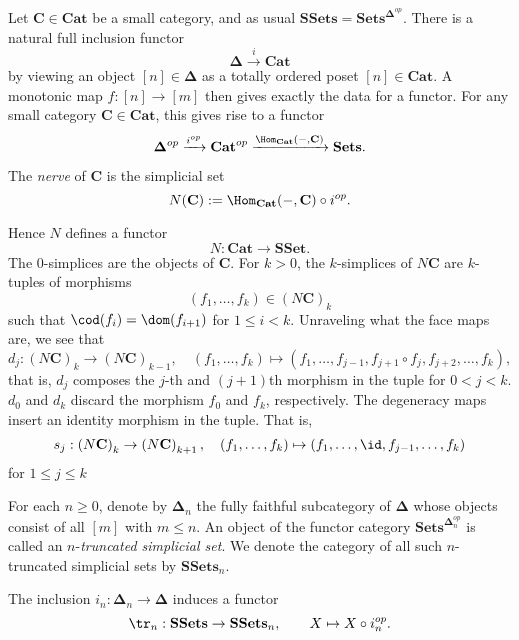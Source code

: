 %
%

Let $\mathbf{C} \in \mathbf{Cat}$ be a small category, and as usual $\mathbf{SSets} = \mathbf{Sets}^{\mathbf{\Delta}^{op}}$. There is a natural full inclusion functor
\[ \mathbf{\Delta} \xrightarrow{i} \mathbf{Cat} \]
by viewing an object $[n] \in \mathbf{\Delta}$ as a totally ordered poset $[n] \in \mathbf{Cat}$. A monotonic map $f : [n] \to [m]$ then gives exactly the data for a functor. For any small category $\mathbf{C} \in \mathbf{Cat}$, this gives rise to a functor
\[ \mathbf{\Delta}^{op} \xrightarrow{i^{op}} \mathbf{Cat}^{op} \xrightarrow{\Hom_{\mathbf{Cat}}\left(-, \mathbf{C}\right)} \mathbf{Sets}. \]
\begin{definition}
\label{def:nerve}
The \emph{nerve} of $\mathbf{C}$ is the simplicial set
\[ N(\mathbf{C}) := \Hom_{\mathbf{Cat}}(-,\mathbf{C}) \circ i^{op}. \]
\end{definition}

Hence $N$ defines a functor
\[ N : \mathbf{Cat} \to \mathbf{SSet}. \]
The $0$-simplices are the objects of $\mathbf{C}$. For $k>0$, the $k$-simplices of $N\mathbf{C}$ are $k$-tuples of morphisms
\[ (f_1,\ldots,f_k) \in \left( N \mathbf{C} \right)_k \]
such that $\cod(f_i) = \dom(f_{i+1})$ for $1 \leq i <k$. Unraveling what the face maps are, we see that
\[ d_j : \left( N \mathbf{C} \right)_k \to \left( N \mathbf{C} \right)_{k-1}, \quad \left(f_1,\ldots,f_k\right) \mapsto \left( f_1, \ldots, f_{j-1}, f_{j+1} \circ f_j, f_{j+2},\ldots, f_k \right), \]
that is, $d_j$ composes the $j$-th and $(j+1)$th morphism in the tuple for $0 < j < k$. $d_0$ and $d_k$ discard the morphism $f_0$ and $f_k$, respectively. The degeneracy maps insert an identity morphism in the tuple. That is,
\[ s_j : \left(N \mathbf{C} \right)_{k} \to \left( N \mathbf{C} \right)_{k+1}, \quad \left(f_1,\ldots,f_k\right) \mapsto \left(f_1,\ldots,\id,f_{j-1},\ldots,f_k \right) \]
for $1 \leq j \leq k$

\begin{definition}
\label{def:truncated order category}
For each $n \geq 0$, denote by $\mathbf{\Delta}_n$ the fully faithful subcategory of $\mathbf{\Delta}$ whose objects consist of all $[m]$ with $m \leq n$.
An object of the functor category $\mathbf{Sets}^{\mathbf{\Delta}^{op}_n}$ is called an $n$-\emph{truncated simplicial set}. We denote the category of all such $n$-truncated simplicial sets by $\mathbf{SSets}_n$.
\end{definition}

The inclusion $i_n : \mathbf{\Delta}_n \to \mathbf{\Delta}$ induces a functor
\[ \tr_n : \mathbf{SSets} \to \mathbf{SSets}_n, \qquad X \mapsto X \circ i_n^{op}. \]



